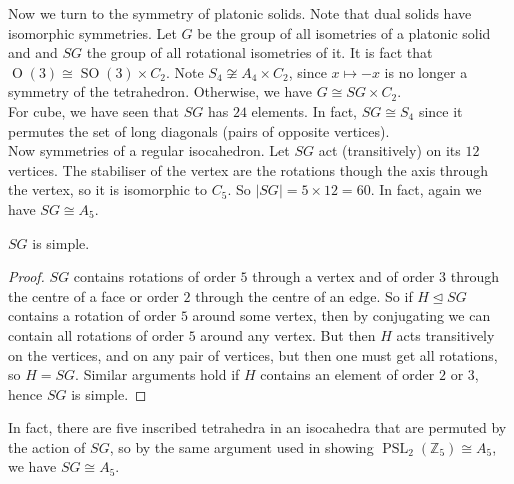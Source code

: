 Now we turn to the symmetry of platonic solids.
Note that dual solids have isomorphic symmetries.
Let $G$ be the group of all isometries of a platonic solid and and $SG$ the group of all rotational isometries of it.
It is fact that $\operatorname{O}(3)\cong \operatorname{SO}(3)\times C_2$.
Note $S_4\not\cong A_4\times C_2$, since $x\mapsto -x$ is no longer a symmetry of the tetrahedron.
Otherwise, we have $G\cong SG\times C_2$.\\
For cube, we have seen that $SG$ has $24$ elements.
In fact, $SG\cong S_4$ since it permutes the set of long diagonals (pairs of opposite vertices).\\
Now symmetries of a regular isocahedron.
Let $SG$ act (transitively) on its $12$ vertices.
The stabiliser of the vertex are the rotations though the axis through the vertex, so it is isomorphic to $C_5$.
So $|SG|=5\times 12=60$.
In fact, again we have $SG\cong A_5$.
\begin{proposition}
    $SG$ is simple.
\end{proposition}
\begin{proof}
    $SG$ contains rotations of order $5$ through a vertex and of order $3$ through the centre of a face or order $2$ through the centre of an edge.
    So if $H\unlhd SG$ contains a rotation of order $5$ around some vertex, then by conjugating we can contain all rotations of order $5$ around any vertex.
    But then $H$ acts transitively on the vertices, and on any pair of vertices, but then one must get all rotations, so $H=SG$.
    Similar arguments hold if $H$ contains an element of order $2$ or $3$, hence $SG$ is simple.
\end{proof}
In fact, there are five inscribed tetrahedra in an isocahedra that are permuted by the action of $SG$, so by the same argument used in showing $\operatorname{PSL}_2(\mathbb Z_5)\cong A_5$, we have $SG\cong A_5$.
